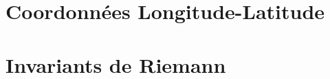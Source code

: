\documentclass[11pt]{thesul}
\begin{document}




 
%
%



\Annexes

\section{Coordonnées Longitude-Latitude}

\section{Invariants de Riemann}






\end{document}
